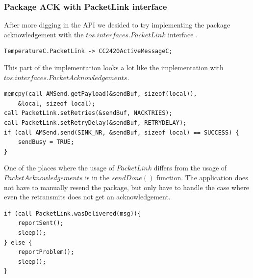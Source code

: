 \subsubsection{Package ACK with PacketLink interface}

After more digging in the API we desided to try implementing the package
acknowledgement with the $tos.interfaces.PacketLink$ interface \cite{telosbAPI}.

\begin{lstlisting}[caption={TemperatureAppC.nc}]
TemperatureC.PacketLink -> CC2420ActiveMessageC;
\end{lstlisting}

This part of the implementation looks a lot like the implementation with \\
$tos.interfaces.PacketAcknowledgements$.

\begin{lstlisting}[caption={TemperatureC.nc $\rightarrow$ sendReadings()}]
memcpy(call AMSend.getPayload(&sendBuf, sizeof(local)),
    &local, sizeof local);
call PacketLink.setRetries(&sendBuf, NACKTRIES);
call PacketLink.setRetryDelay(&sendBuf, RETRYDELAY);
if (call AMSend.send(SINK_NR, &sendBuf, sizeof local) == SUCCESS) {
    sendBusy = TRUE;
}
\end{lstlisting}

One of the places where the usage of $PacketLink$ differs from the usage of \\
$PacketAcknowledgements$ is in the $sendDone()$ function. The application does
not have to manually resend the package, but only have to handle the case where
even the retransmits does not get an acknowledgement.

\begin{lstlisting}[caption={TemperatureC.nc $\rightarrow$ AMSend.sendDone()}]
if (call PacketLink.wasDelivered(msg)){
    reportSent();
    sleep();
} else {
    reportProblem();
    sleep();
}
\end{lstlisting}


